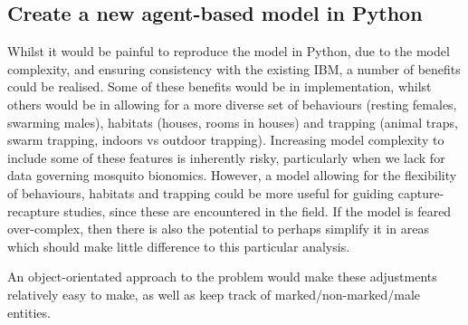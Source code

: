 \documentclass{article}
\begin{document}
\subsection{Create a new agent-based model in Python}
Whilst it would be painful to reproduce the model in Python, due to the model complexity, and ensuring consistency with the existing IBM, a number of benefits could be realised. Some of these benefits would be in implementation, whilst others would be in allowing for a more diverse set of behaviours (resting females, swarming males), habitats (houses, rooms in houses) and trapping (animal traps, swarm trapping, indoors vs outdoor trapping). Increasing model complexity to include some of these features is inherently risky, particularly when we lack for data governing mosquito bionomics. However, a model allowing for the flexibility of behaviours, habitats and trapping could be more useful for guiding capture-recapture studies, since these are encountered in the field. If the model is feared over-complex, then there is also the potential to perhaps simplify it in areas which should make little difference to this particular analysis.

An object-orientated approach to the problem would make these adjustments relatively easy to make, as well as keep track of marked/non-marked/male entities. 
\end{document}
